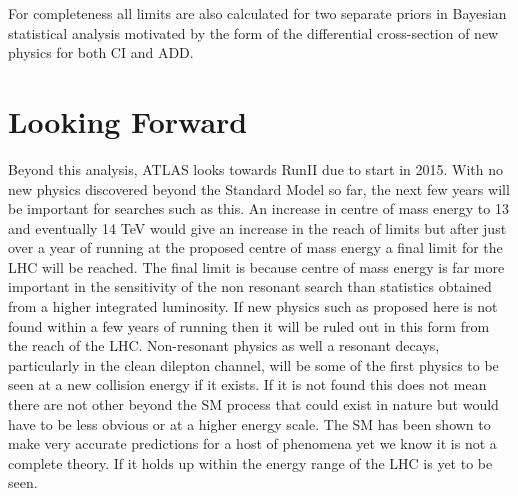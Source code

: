 For completeness all limits are also calculated for two separate priors in Bayesian statistical analysis motivated by the form of the differential cross-section of new physics for both CI and ADD.


\section{Looking Forward}

Beyond this analysis, ATLAS looks towards RunII due to start in 2015. With no new physics discovered beyond the Standard Model so far, the next few years will be important for searches such as this. An increase in centre of mass energy to 13 and eventually 14 TeV would give an increase in the reach of limits but after just over a year of running at the proposed centre of mass energy a final limit for the LHC will be reached. The final limit is because centre of mass energy is far more important in the sensitivity of the non resonant search than statistics obtained from a higher integrated luminosity. If new physics such as proposed here is not found within a few years of running then it will be ruled out in this form from the reach of the LHC. Non-resonant physics as well a resonant decays, particularly in the clean dilepton channel, will be some of the first physics to be seen at a new collision energy if it exists. If it is not found this does not mean there are not other beyond the SM process that could exist in nature but would have to be less obvious or at a higher energy scale. The SM has been shown to make very accurate predictions for a host of phenomena yet we know it is not a complete theory. If it holds up within the energy range of the LHC is yet to be seen. 





